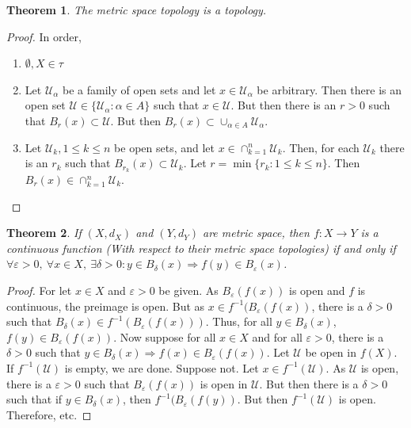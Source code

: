 \documentclass[oneside]{book}
\theoremstyle{mystyle}
\newtheorem{theorem}{Theorem}[section]
\begin{document}
\begin{theorem}
The metric space topology is a topology.
\end{theorem}
\begin{proof}
In order,
\begin{enumerate}
\item $\emptyset, X \in \tau$
\item Let $\mathcal{U}_{\alpha}$ be a family of open sets and let $x\in \mathcal{U}_{\alpha}$ be arbitrary. Then there is an open set $\mathcal{U} \in \{\mathcal{U}_{\alpha}:\alpha\in A\}$ such that $x\in \mathcal{U}$. But then there is an $r>0$ such that $B_{r}(x)\subset\mathcal{U}$. But then $B_{r}(x) \subset \cup_{\alpha \in A}\mathcal{U}_{\alpha}$.
\item Let $\mathcal{U}_{k}, 1\leq k \leq n$ be open sets, and let $x\in \cap_{k=1}^{n} \mathcal{U}_k$. Then, for each $\mathcal{U}_k$ there is an $r_{k}$ such that $B_{r_k}(x)\subset \mathcal{U}_{k}$. Let $r = \min\{r_k:1\leq k \leq n\}$. Then $B_{r}(x) \in \cap_{k=1}^{n}\mathcal{U}_k$.
\end{enumerate}
\end{proof}

\begin{theorem}
If $(X,d_X)$ and $(Y,d_Y)$ are metric space, then $f:X\rightarrow Y$ is a continuous function (With respect to their metric space topologies) if and only if $\forall \varepsilon>0,\ \forall x\in X,\ \exists \delta>0:y\in B_{\delta}(x)\Rightarrow f(y) \in B_{\varepsilon}(x)$.
\end{theorem}
\begin{proof}
For let $x\in X$ and $\varepsilon>0$ be given. As $B_{\varepsilon}(f(x))$ is open and $f$ is continuous, the preimage is open. But as $x\in f^{-1}(B_{\varepsilon}(f(x))$, there is a $\delta>0$ such that $B_{\delta}(x)\in f^{-1}(B_{\varepsilon}(f(x)))$. Thus, for all $y \in B_{\delta}(x)$, $f(y) \in B_{\varepsilon}(f(x))$. Now suppose for all $x\in X$ and for all $\varepsilon>0$, there is a $\delta>0$ such that $y\in B_{\delta}(x)\Rightarrow f(x) \in B_{\varepsilon}(f(x))$. Let $\mathcal{U}$ be open in $f(X)$. If $f^{-1}(\mathcal{U})$ is empty, we are done. Suppose not. Let $x\in f^{-1}(\mathcal{U})$. As $\mathcal{U}$ is open, there is a $\varepsilon>0$ such that $B_{\varepsilon}(f(x))$ is open in $\mathcal{U}$. But then there is a $\delta>0$ such that if $y\in B_{\delta}(x)$, then $f^{-1}(B_{\varepsilon}(f(y))$. But then $f^{-1}(\mathcal{U})$ is open. Therefore, etc.
\end{proof}
\end{document}
